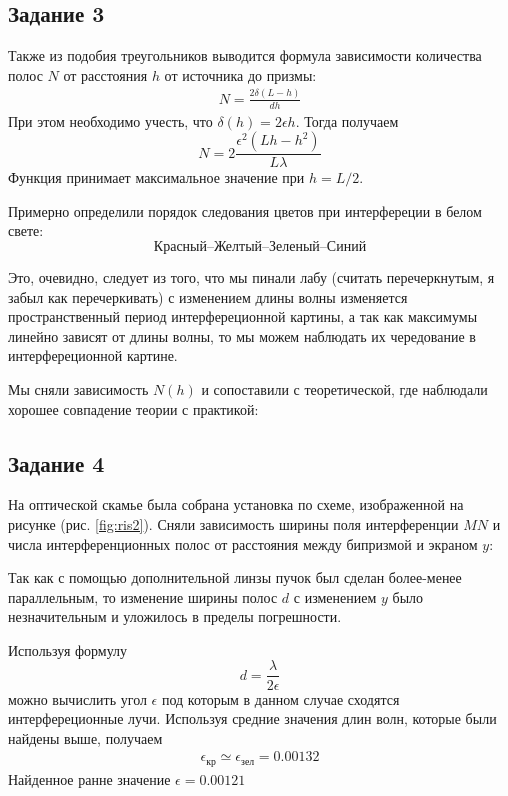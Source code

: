 \subsection{Задание 3}
Также из подобия треугольников выводится формула зависимости количества полос $N$ от расстояния $h$ от источника до призмы:
\begin{gather}
	N=\frac{2\delta(L-h)}{dh} \nonumber
\end{gather}
При этом необходимо учесть, что $\delta(h)=2\epsilon h$. Тогда получаем 
\begin{equation}
	N=2\frac{\epsilon^2(Lh-h^2)}{L\lambda}
\end{equation}
Функция принимает максимальное значение при $h=L/2$.

Примерно определили порядок следования цветов при интерфереции в белом свете:
\begin{equation}
	\text{Красный--Желтый--Зеленый--Синий}
\end{equation}

Это, очевидно, следует из того, что мы пинали лабу (считать перечеркнутым, я забыл как перечеркивать) с изменением длины волны изменяется пространственный период интерфереционной картины, а так как максимумы линейно зависят от длины волны, то мы можем наблюдать их чередование в интерфереционной картине.  

Мы сняли зависимость $N(h)$ и сопоставили с теоретической, где наблюдали хорошее совпадение теории с практикой:



\subsection{Задание 4}
На оптической скамье была собрана установка по схеме, изображенной на рисунке (рис. \ref{fig:ris2}). Сняли зависимость ширины поля интерференции $MN$ и числа интерференционных полос от расстояния между бипризмой	 и экраном $y$:



Так как с помощью дополнительной линзы пучок был сделан более-менее параллельным, то изменение ширины полос $d$ с изменением $y$ было незначительным и уложилось в пределы погрешности.

Используя формулу 
\begin{equation}
	d=\frac{\lambda}{2\epsilon}	
\end{equation}
можно вычислить угол $\epsilon$ под которым в данном случае сходятся интерфереционные лучи. Используя средние значения длин волн, которые были найдены выше, получаем
\begin{gather*}
	\epsilon_{\text{кр}}\simeq\epsilon_{\text{зел}}=0.00132
\end{gather*}
 Найденное ранне значение $\epsilon=0.00121$

